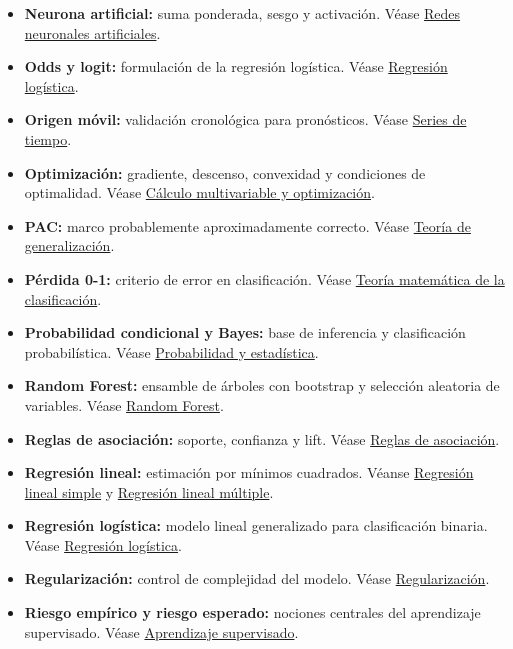\documentclass[
  spanish,
  10.5pt,
  letterpaper,
  DIV=11,
  numbers=noendperiod,
  oneside,
  open=any]{scrreprt}
\providecommand{\tightlist}{%
  \setlength{\itemsep}{0pt}\setlength{\parskip}{0pt}}
\theoremstyle{definition}
\theoremstyle{definition}
\theoremstyle{plain}
\theoremstyle{remark}
\begin{document}
\begin{itemize}
\tightlist
\item
  \textbf{Neurona artificial:} suma ponderada, sesgo y activación. Véase
  \hyperref[sec-redes-neuronales]{Redes neuronales artificiales}.
\item
  \textbf{Odds y logit:} formulación de la regresión logística. Véase
  \hyperref[sec-regresion-logistica]{Regresión logística}.
\item
  \textbf{Origen móvil:} validación cronológica para pronósticos. Véase
  \hyperref[sec-series-tiempo]{Series de tiempo}.
\item
  \textbf{Optimización:} gradiente, descenso, convexidad y condiciones
  de optimalidad. Véase \hyperref[sec-calculo-optimizacion]{Cálculo
  multivariable y optimización}.
\item
  \textbf{PAC:} marco probablemente aproximadamente correcto. Véase
  \hyperref[sec-teoria-generalizacion]{Teoría de generalización}.
\item
  \textbf{Pérdida 0-1:} criterio de error en clasificación. Véase
  \hyperref[sec-teoria-clasificacion]{Teoría matemática de la
  clasificación}.
\item
  \textbf{Probabilidad condicional y Bayes:} base de inferencia y
  clasificación probabilística. Véase
  \hyperref[sec-probabilidad-estadistica]{Probabilidad y estadística}.
\item
  \textbf{Random Forest:} ensamble de árboles con bootstrap y selección
  aleatoria de variables. Véase \hyperref[sec-random-forest]{Random
  Forest}.
\item
  \textbf{Reglas de asociación:} soporte, confianza y lift. Véase
  \hyperref[sec-reglas-asociacion]{Reglas de asociación}.
\item
  \textbf{Regresión lineal:} estimación por mínimos cuadrados. Véanse
  \hyperref[sec-regresion-lineal-simple]{Regresión lineal simple} y
  \hyperref[sec-regresion-lineal-multiple]{Regresión lineal múltiple}.
\item
  \textbf{Regresión logística:} modelo lineal generalizado para
  clasificación binaria. Véase
  \hyperref[sec-regresion-logistica]{Regresión logística}.
\item
  \textbf{Regularización:} control de complejidad del modelo. Véase
  \hyperref[sec-regularizacion]{Regularización}.
\item
  \textbf{Riesgo empírico y riesgo esperado:} nociones centrales del
  aprendizaje supervisado. Véase
  \hyperref[sec-aprendizaje-supervisado]{Aprendizaje supervisado}.
\end{itemize}
\end{document}
